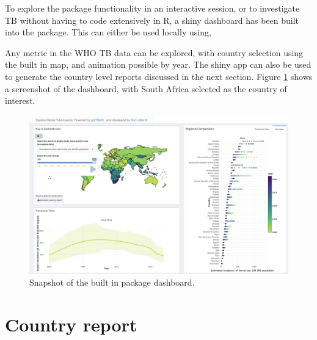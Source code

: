 \documentclass[11pt,twoside]{bristolthesis}
\begin{document}
  To explore the package functionality in an interactive session, or to investigate TB without having to code extensively in R, a shiny dashboard has been built into the package. This can either be used locally using,
  \begin{Shaded}
  \begin{Highlighting}[]
  \NormalTok{()}
  \end{Highlighting}
  \end{Shaded}
  Any metric in the WHO TB data can be explored, with country selection using the built in map, and animation possible by year. The shiny app can also be used to generate the country level reports discussed in the next section. Figure \ref{fig:dash-snapshot} shows a screenshot of the dashboard, with South Africa selected as the country of interest.
  \begin{figure}
  
  {\centering \includegraphics[width=0.8\linewidth]{chapters/getTBinR/img/ExploreGlobalTB} 
  
  }
  
  \caption{Snapshot of the built in package dashboard.}\label{fig:dash-snapshot}
  \end{figure}
  \hypertarget{country-report}{%
  \section{Country report}\label{country-report}}
  
\end{document}
